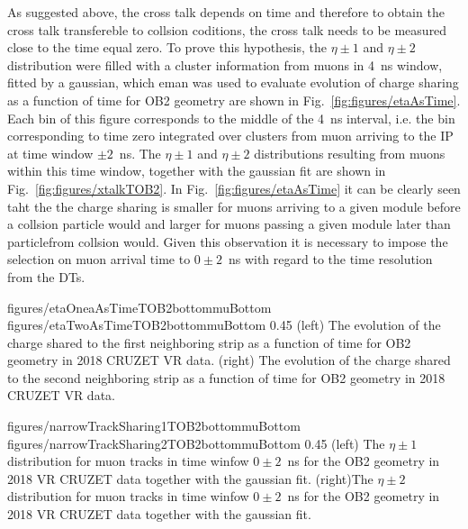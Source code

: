As suggested above, the cross talk depends on time and therefore to obtain the cross talk transfereble to collsion coditions, the cross talk needs to be measured close to the time equal zero. To prove this hypothesis, the $\eta \pm 1$ and $\eta \pm 2$ distribution were filled with a cluster information from muons in 4~ns window, fitted by a gaussian, which eman was used to evaluate evolution of charge sharing as a function of time for OB2 geometry are shown in Fig.~\ref{fig:figures/etaAsTime}. Each bin of this figure corresponds to the middle of the 4~ns interval, i.e. the bin corresponding to time zero integrated over clusters from muon arriving to the IP at time window $\pm 2$~ns. The $\eta \pm 1$ and $\eta \pm 2$ distributions resulting from muons within this time window, together with the gaussian fit are shown in Fig.~\ref{fig:figures/xtalkTOB2}. In Fig.~\ref{fig:figures/etaAsTime} it can be clearly seen taht the the charge sharing is smaller for muons arriving to a given module before a collsion particle would and larger for muons passing a given module later than particlefrom collsion would. Given this observation it is necessary to impose the selection on muon arrival time to $0 \pm 2$~ns with regard to the time resolution from the DTs.

                 {figures/etaOneaAsTimeTOB2bottommuBottom}
                 {figures/etaTwoAsTimeTOB2bottommuBottom} %
                 {0.45}       %
                 {(left) The evolution of the charge shared to the first neighboring strip as a function of time for OB2 geometry in 2018 CRUZET VR data.  (right) The evolution of the charge shared to the second neighboring strip as a function of time for OB2 geometry in 2018 CRUZET VR data. }

                 {figures/narrowTrackSharing1TOB2bottommuBottom}
                 {figures/narrowTrackSharing2TOB2bottommuBottom} %
                 {0.45}       %
                 {(left) The $\eta \pm 1$  distribution for muon tracks in time winfow $0 \pm 2$~ns for the OB2 geometry in 2018 VR CRUZET data together with the gaussian fit. (right)The $\eta \pm 2$  distribution for muon tracks in time winfow $0 \pm 2$~ns for the OB2 geometry in 2018 VR CRUZET data together with the gaussian fit.  }



